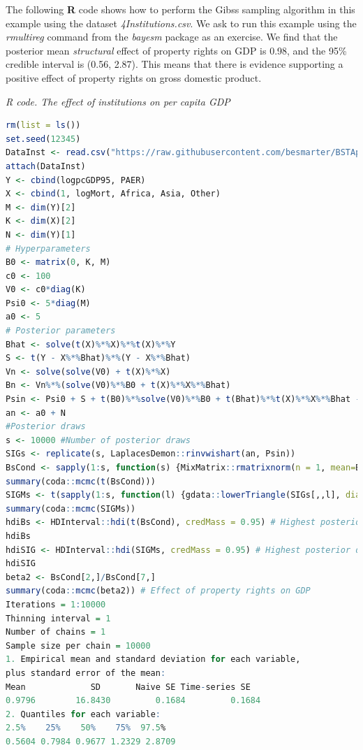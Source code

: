 The following \textbf{R} code shows how to perform the Gibss sampling algorithm in this example using the dataset \textit{4Institutions.csv}. We ask to run this example using the \textit{rmultireg} command from the \textit{bayesm} package as an exercise. We find that the posterior mean \textit{structural} effect of property rights on GDP is 0.98, and the 95\% credible interval is (0.56, 2.87). This means that there is evidence supporting a positive effect of property rights on gross domestic product. 

\begin{tcolorbox}[enhanced,width=4.67in,center upper,
	fontupper=\large\bfseries,drop shadow southwest,sharp corners]
	\textit{R code. The effect of institutions on per capita GDP}
	\begin{VF}
		\begin{lstlisting}[language=R]
rm(list = ls())
set.seed(12345)
DataInst <- read.csv("https://raw.githubusercontent.com/besmarter/BSTApp/refs/heads/master/DataApp/4Institutions.csv", sep = ",", header = TRUE, quote = "")
attach(DataInst)
Y <- cbind(logpcGDP95, PAER)
X <- cbind(1, logMort, Africa, Asia, Other)
M <- dim(Y)[2]
K <- dim(X)[2]
N <- dim(Y)[1]
# Hyperparameters
B0 <- matrix(0, K, M)
c0 <- 100
V0 <- c0*diag(K)
Psi0 <- 5*diag(M)
a0 <- 5
# Posterior parameters
Bhat <- solve(t(X)%*%X)%*%t(X)%*%Y 
S <- t(Y - X%*%Bhat)%*%(Y - X%*%Bhat)
Vn <- solve(solve(V0) + t(X)%*%X) 
Bn <- Vn%*%(solve(V0)%*%B0 + t(X)%*%X%*%Bhat)
Psin <- Psi0 + S + t(B0)%*%solve(V0)%*%B0 + t(Bhat)%*%t(X)%*%X%*%Bhat - t(Bn)%*%solve(Vn)%*%Bn
an <- a0 + N
#Posterior draws
s <- 10000 #Number of posterior draws
SIGs <- replicate(s, LaplacesDemon::rinvwishart(an, Psin))
BsCond <- sapply(1:s, function(s) {MixMatrix::rmatrixnorm(n = 1, mean=Bn, U = Vn,V = SIGs[,,s])})
summary(coda::mcmc(t(BsCond)))
SIGMs <- t(sapply(1:s, function(l) {gdata::lowerTriangle(SIGs[,,l], diag=TRUE, byrow=FALSE)}))
summary(coda::mcmc(SIGMs))
hdiBs <- HDInterval::hdi(t(BsCond), credMass = 0.95) # Highest posterior density credible interval
hdiBs
hdiSIG <- HDInterval::hdi(SIGMs, credMass = 0.95) # Highest posterior density credible interval
hdiSIG
beta2 <- BsCond[2,]/BsCond[7,] 
summary(coda::mcmc(beta2)) # Effect of property rights on GDP
Iterations = 1:10000
Thinning interval = 1 
Number of chains = 1 
Sample size per chain = 10000 
1. Empirical mean and standard deviation for each variable,
plus standard error of the mean:
Mean             SD       Naive SE Time-series SE 
0.9796        16.8430         0.1684         0.1684 
2. Quantiles for each variable:
2.5%    25%    50%    75%  97.5% 
0.5604 0.7984 0.9677 1.2329 2.8709 
\end{lstlisting}
	\end{VF}
\end{tcolorbox} 

